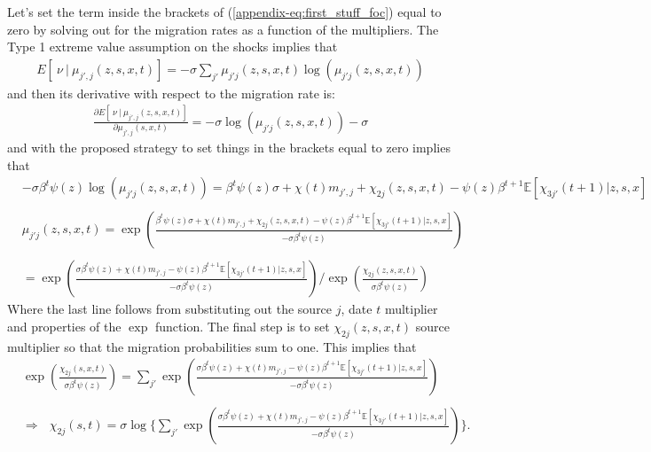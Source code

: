 \documentclass[12pt,pdftex]{article}
\begin{document}
\begin{onehalfspacing}
Let's set the term inside the brackets of (\ref{appendix-eq:first_stuff_foc}) equal to zero by solving out for the migration rates as a function of the multipliers. The Type 1 extreme value assumption on the shocks implies that
\begin{align}
E[\ \nu \ | \ \mu_{j',j}(z,s,x,t)] = -\sigma \sum_{j'}\mu_{j'j}(z,s,x,t) \log \left(\mu_{j'j}(z,s,x,t)\right)
\end{align}
and then its derivative with respect to the migration rate is:
\begin{align}
\frac{\partial E[\ \nu \ | \ \mu_{j',j}(z,s,x,t)]}{\partial \mu_{j',j}(s,x,t)} = -\sigma \log \left(\mu_{j'j}(z,s,x,t)\right) - \sigma
\end{align}
and with the proposed strategy to set things in the brackets equal to zero implies that
{\small
\begin{align}
&-\sigma  \beta^{t} \psi(z)  \log \left(\mu_{j'j}(z,s,x,t)\right)  =  \beta^{t} \psi(z) \sigma + \chi(t) m_{j',j} + \chi_{2j}(z,s,x,t) - \psi(z)\beta^{t+1}\mathbb{E}\left[\chi_{3j'}(t+1)| z, s, x \right] \nonumber\\
\nonumber \\
&\mu_{j'j}(z,s,x,t) = \exp \left( \frac{\beta^{t} \psi(z) \sigma + \chi(t) m_{j',j} + \chi_{2j}(z,s,x,t) - \psi(z)\beta^{t+1}\mathbb{E}\left[\chi_{3j'}(t+1)|z, s,x \right]}{-\sigma \beta^{t} \psi(z) } \right)  \\
\nonumber \\
&= \exp \left( \frac{\sigma \beta^{t} \psi(z) + \chi(t) m_{j',j} - \psi(z)\beta^{t+1}\mathbb{E}\left[\chi_{3j'}(t+1)|z, s, x \right]}{-\sigma \beta^{t} \psi(z) } \right) \Bigg / \exp \left(\frac{\chi_{2j}(z,s,x,t)}{\sigma \beta^{t} \psi(z) } \right) \nonumber
\end{align}}Where the last line follows from substituting out the source $j$, date $t$ multiplier and properties of the $\exp$ function. The final step is to set $\chi_{2j}(z,s,x,t)$ source multiplier so that the migration probabilities sum to one. This implies that
{\small
\begin{align}
&\exp \left(\frac{\chi_{2j}(s,x,t)}{\sigma \beta^{t} \psi(z)} \right)  = \sum_{j'} \exp \left( \frac{\sigma \beta^{t} \psi(z) + \chi(t) m_{j',j} - \psi(z)\beta^{t+1}\mathbb{E}\left[\chi_{3j'}(t+1) | z, s, x \right]}{-\sigma \beta^{t} \psi(z)  } \right) \\
\nonumber \\
& \Rightarrow \ \ \ \chi_{2j}(s,t) = \sigma \log  \Bigg \{  \sum_{j'} \exp \left( \frac{\sigma \beta^{t} \psi(z) + \chi(t) m_{j',j} - \psi(z)\beta^{t+1}\mathbb{E}\left[\chi_{3j'}(t+1)| z, s, x \right]}{-\sigma \beta^{t} \psi(z) } \right) \Bigg \}.

\end{align}}
\end{onehalfspacing}
\end{document}

